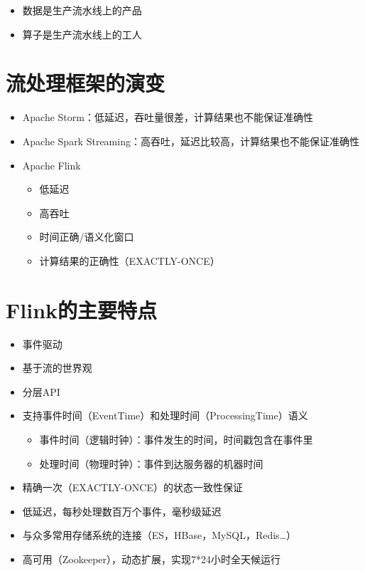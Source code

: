 \documentclass[cn,11pt,chinese]{elegantbook}
\begin{document}
\begin{itemize}
  \item 数据是生产流水线上的产品
  \item 算子是生产流水线上的工人
\end{itemize}

\section{流处理框架的演变}

\begin{itemize}
  \item Apache Storm：低延迟，吞吐量很差，计算结果也不能保证准确性
  \item Apache Spark Streaming：高吞吐，延迟比较高，计算结果也不能保证准确性
  \item Apache Flink
  \begin{itemize}
    \item 低延迟
    \item 高吞吐
    \item 时间正确/语义化窗口
    \item 计算结果的正确性（EXACTLY-ONCE）
  \end{itemize}
\end{itemize}

\section{Flink的主要特点}

\begin{itemize}
  \item 事件驱动
  \item 基于流的世界观
  \item 分层API
  \item 支持事件时间（EventTime）和处理时间（ProcessingTime）语义
    \begin{itemize}
      \item 事件时间（逻辑时钟）：事件发生的时间，时间戳包含在事件里
      \item 处理时间（物理时钟）：事件到达服务器的机器时间
    \end{itemize}
  \item 精确一次（EXACTLY-ONCE）的状态一致性保证
  \item 低延迟，每秒处理数百万个事件，毫秒级延迟
  \item 与众多常用存储系统的连接（ES，HBase，MySQL，Redis…）
  \item 高可用（Zookeeper），动态扩展，实现7*24小时全天候运行
\end{itemize}
\end{document}
